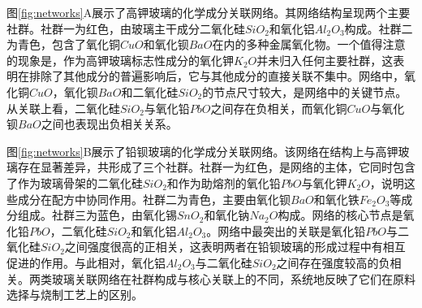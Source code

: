 图\ref{fig:networks}A展示了高钾玻璃的化学成分关联网络。其网络结构呈现两个主要社群。社群一为红色，由玻璃主干成分二氧化硅$SiO_2$和氧化铝$Al_2O_3$构成。社群二为青色，包含了氧化铜$CuO$和氧化钡$BaO$在内的多种金属氧化物。一个值得注意的现象是，作为高钾玻璃标志性成分的氧化钾$K_2O$并未归入任何主要社群，这表明在排除了其他成分的普遍影响后，它与其他成分的直接关联不集中。网络中，氧化铜$CuO$，氧化钡$BaO$和二氧化硅$SiO_2$的节点尺寸较大，是网络中的关键节点。从关联上看，二氧化硅$SiO_2$与氧化铅$PbO$之间存在负相关，而氧化铜$CuO$与氧化钡$BaO$之间也表现出负相关关系。

图\ref{fig:networks}B展示了铅钡玻璃的化学成分关联网络。该网络在结构上与高钾玻璃存在显著差异，共形成了三个社群。社群一为红色，是网络的主体，它同时包含了作为玻璃骨架的二氧化硅$SiO_2$和作为助熔剂的氧化铅$PbO$与氧化钾$K_2O$，说明这些成分在配方中协同作用。社群二为青色，主要由氧化钡$BaO$和氧化铁$Fe_2O_3$等成分组成。社群三为蓝色，由氧化锡$SnO_2$和氧化钠$Na_2O$构成。网络的核心节点是氧化铅$PbO$，二氧化硅$SiO_2$和氧化铝$Al_2O_3$。网络中最突出的关联是氧化铅$PbO$与二氧化硅$SiO_2$之间强度很高的正相关，这表明两者在铅钡玻璃的形成过程中有相互促进的作用。与此相对，氧化铝$Al_2O_3$与二氧化硅$SiO_2$之间存在强度较高的负相关。两类玻璃关联网络在社群构成与核心关联上的不同，系统地反映了它们在原料选择与烧制工艺上的区别。

